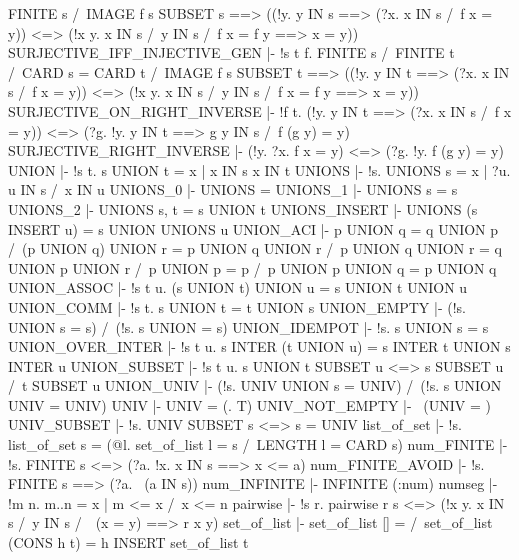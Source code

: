          FINITE s /\ IMAGE f s SUBSET s
         ==> ((!y. y IN s ==> (?x. x IN s /\ f x = y)) <=>
              (!x y. x IN s /\ y IN s /\ f x = f y ==> x = y))
\ENDTHEOREM
\THEOREM SURJECTIVE\_IFF\_INJECTIVE\_GEN
  |- !s t f.
         FINITE s /\ FINITE t /\ CARD s = CARD t /\ IMAGE f s SUBSET t
         ==> ((!y. y IN t ==> (?x. x IN s /\ f x = y)) <=>
              (!x y. x IN s /\ y IN s /\ f x = f y ==> x = y))
\ENDTHEOREM
\THEOREM SURJECTIVE\_ON\_RIGHT\_INVERSE
  |- !f t.
         (!y. y IN t ==> (?x. x IN s /\ f x = y)) <=>
         (?g. !y. y IN t ==> g y IN s /\ f (g y) = y)
\ENDTHEOREM
\THEOREM SURJECTIVE\_RIGHT\_INVERSE
  |- (!y. ?x. f x = y) <=> (?g. !y. f (g y) = y)
\ENDTHEOREM
\THEOREM UNION
  |- !s t. s UNION t = {x | x IN s \/ x IN t}
\ENDTHEOREM
\THEOREM UNIONS
  |- !s. UNIONS s = {x | ?u. u IN s /\ x IN u}
\ENDTHEOREM
\THEOREM UNIONS\_0
  |- UNIONS {} = {}
\ENDTHEOREM
\THEOREM UNIONS\_1
  |- UNIONS {s} = s
\ENDTHEOREM
\THEOREM UNIONS\_2
  |- UNIONS {s, t} = s UNION t
\ENDTHEOREM
\THEOREM UNIONS\_INSERT
  |- UNIONS (s INSERT u) = s UNION UNIONS u
\ENDTHEOREM
\THEOREM UNION\_ACI
  |- p UNION q = q UNION p /\
     (p UNION q) UNION r = p UNION q UNION r /\
     p UNION q UNION r = q UNION p UNION r /\
     p UNION p = p /\
     p UNION p UNION q = p UNION q
\ENDTHEOREM
\THEOREM UNION\_ASSOC
  |- !s t u. (s UNION t) UNION u = s UNION t UNION u
\ENDTHEOREM
\THEOREM UNION\_COMM
  |- !s t. s UNION t = t UNION s
\ENDTHEOREM
\THEOREM UNION\_EMPTY
  |- (!s. {} UNION s = s) /\ (!s. s UNION {} = s)
\ENDTHEOREM
\THEOREM UNION\_IDEMPOT
  |- !s. s UNION s = s
\ENDTHEOREM
\THEOREM UNION\_OVER\_INTER
  |- !s t u. s INTER (t UNION u) = s INTER t UNION s INTER u
\ENDTHEOREM
\THEOREM UNION\_SUBSET
  |- !s t u. s UNION t SUBSET u <=> s SUBSET u /\ t SUBSET u
\ENDTHEOREM
\THEOREM UNION\_UNIV
  |- (!s. UNIV UNION s = UNIV) /\ (!s. s UNION UNIV = UNIV)
\ENDTHEOREM
\THEOREM UNIV
  |- UNIV = (\x. T)
\ENDTHEOREM
\THEOREM UNIV\_NOT\_EMPTY
  |- ~(UNIV = {})
\ENDTHEOREM
\THEOREM UNIV\_SUBSET
  |- !s. UNIV SUBSET s <=> s = UNIV
\ENDTHEOREM
\THEOREM list\_of\_set
  |- !s. list_of_set s = (@l. set_of_list l = s /\ LENGTH l = CARD s)
\ENDTHEOREM
\THEOREM num\_FINITE
  |- !s. FINITE s <=> (?a. !x. x IN s ==> x <= a)
\ENDTHEOREM
\THEOREM num\_FINITE\_AVOID
  |- !s. FINITE s ==> (?a. ~(a IN s))
\ENDTHEOREM
\THEOREM num\_INFINITE
  |- INFINITE (:num)
\ENDTHEOREM
\THEOREM numseg
  |- !m n. m..n = {x | m <= x /\ x <= n}
\ENDTHEOREM
\THEOREM pairwise
  |- !s r. pairwise r s <=> (!x y. x IN s /\ y IN s /\ ~(x = y) ==> r x y)
\ENDTHEOREM
\THEOREM set\_of\_list
  |- set_of_list [] = {} /\ set_of_list (CONS h t) = h INSERT set_of_list t
\ENDTHEOREM

